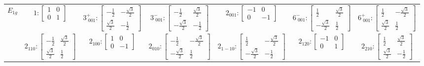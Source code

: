 \documentclass[fleqn,8pt,landscape]{jsarticle}
\begin{document}
\begin{longtable}{ccccccc}
$ E_{1g} $ & $ 1:\begin{bmatrix} 1 & 0 \\ 0 & 1 \end{bmatrix} $ & $ 3^{+}_{\,\,001}:\begin{bmatrix} - \frac{1}{2} & - \frac{\sqrt{3}}{2} \\ \frac{\sqrt{3}}{2} & - \frac{1}{2} \end{bmatrix} $ & $ 3^{-}_{\,\,001}:\begin{bmatrix} - \frac{1}{2} & \frac{\sqrt{3}}{2} \\ - \frac{\sqrt{3}}{2} & - \frac{1}{2} \end{bmatrix} $ & $ 2{}_{001}:\begin{bmatrix} -1 & 0 \\ 0 & -1 \end{bmatrix} $ & $ 6^{-}_{\,\,001}:\begin{bmatrix} \frac{1}{2} & \frac{\sqrt{3}}{2} \\ - \frac{\sqrt{3}}{2} & \frac{1}{2} \end{bmatrix} $ & $ 6^{+}_{\,\,001}:\begin{bmatrix} \frac{1}{2} & - \frac{\sqrt{3}}{2} \\ \frac{\sqrt{3}}{2} & \frac{1}{2} \end{bmatrix} $ \\
& $ 2{}_{110}:\begin{bmatrix} - \frac{1}{2} & \frac{\sqrt{3}}{2} \\ \frac{\sqrt{3}}{2} & \frac{1}{2} \end{bmatrix} $ & $ 2{}_{100}:\begin{bmatrix} 1 & 0 \\ 0 & -1 \end{bmatrix} $ & $ 2{}_{010}:\begin{bmatrix} - \frac{1}{2} & - \frac{\sqrt{3}}{2} \\ - \frac{\sqrt{3}}{2} & \frac{1}{2} \end{bmatrix} $ & $ 2{}_{1-10}:\begin{bmatrix} \frac{1}{2} & - \frac{\sqrt{3}}{2} \\ - \frac{\sqrt{3}}{2} & - \frac{1}{2} \end{bmatrix} $ & $ 2{}_{120}:\begin{bmatrix} -1 & 0 \\ 0 & 1 \end{bmatrix} $ & $ 2{}_{210}:\begin{bmatrix} \frac{1}{2} & \frac{\sqrt{3}}{2} \\ \frac{\sqrt{3}}{2} & - \frac{1}{2} \end{bmatrix} $ \\

\end{longtable}
\end{document}
